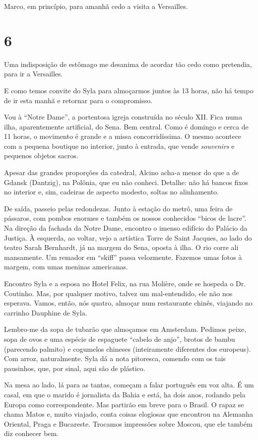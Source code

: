 Marco, em princípio, para amanhã cedo a visita a Versailles.

\section*{6 \adfflatleafright {}}
Uma indisposição de estômago me desanima de acordar tão cedo como pretendia, para ir a Versailles.

E como temos convite do Syla para almoçarmos juntos às 13 horas, não há tempo de ir esta manhã e retornar para o compromisso.

Vou à ``Notre Dame'', a portentosa igreja construída no século XII. Fica numa ilha, aparentemente artificial, do Sena. Bem central. Como é domingo e cerca de 11 horas, o movimento é grande e a missa concorridíssima. O mesmo acontece com a pequena boutique no interior, junto à entrada, que vende \textit{souvenirs} e pequenos objetos sacros.

Apesar das grandes proporções da catedral, Alcino acha-a menor do que a de Gdansk (Dantzig), na Polônia, que eu não conheci. Detalhe: não há bancos fixos no interior e, sim, cadeiras de aspecto modesto, soltas no alinhamento.

De saída, passeio pelas redondezas. Junto à estação do metrô, uma feira de pássaros, com pombos enormes e também os nossos conhecidos ``bicos de lacre''. Na direção da fachada da Notre Dame, encontro o imenso edifício do Palácio da Justiça. À esquerda, ao voltar, vejo a artística Torre de Saint Jacques, ao lado do teatro Sarah Bernhardt, já na margem do Sena, oposta à ilha. O rio corre ali mansamente. Um remador em ``skiff'' passa velozmente. Fazemos umas fotos à margem, com umas meninas americanas.

Encontro Syla e a esposa no Hotel Felix, na rua Molière, onde se hospeda o Dr. Coutinho. Mas, por qualquer motivo, talvez um mal-entendido, ele não nos esperava. Vamos, então, nós quatro, almoçar num restaurante chinês, viajando no carrinho Dauphine de Syla.

Lembro-me da sopa de tubarão que almoçamos em Amsterdam. Pedimos peixe, sopa de ovos e uma espécie de espaguete ``cabelo de anjo'', brotos de bambu (parecendo palmito) e cogumelos chineses (inteiramente diferentes dos europeus). Com arroz, naturalmente. Syla dá a nota pitoresca, comendo com os tais pausinhos, que, por sinal, aqui são de plástico.

Na mesa ao lado, lá para as tantas, começam a falar português em voz alta. É um casal, em que o marido é jornalista da Bahia e está, ha dois anos, rodando pela Europa como correspondente. Mas partirão em breve para o Brasil. O rapaz se chama Matos e, muito viajado, conta coisas elogiosas que encontrou na Alemanha Oriental, Praga e Bucareste. Trocamos impressões sobre Moscou, que ele também diz conhecer bem.

